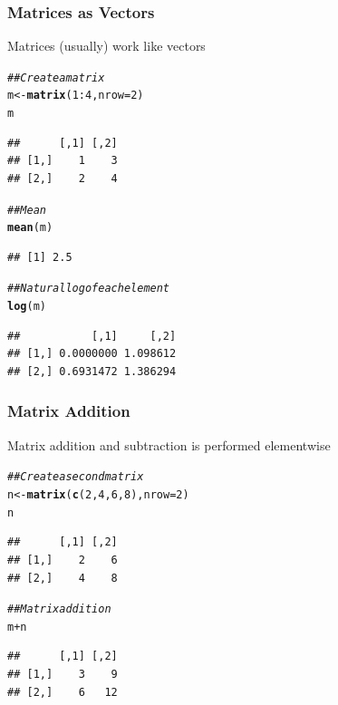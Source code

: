 \documentclass{beamer}\usepackage[]{graphicx}\usepackage[]{color}
\makeatletter
\newcommand{\hlnum}[1]{\textcolor[rgb]{0.686,0.059,0.569}{#1}}%
\newcommand{\hlcom}[1]{\textcolor[rgb]{0.678,0.584,0.686}{\textit{#1}}}%
\newcommand{\hlopt}[1]{\textcolor[rgb]{0,0,0}{#1}}%
\newcommand{\hlstd}[1]{\textcolor[rgb]{0.345,0.345,0.345}{#1}}%
\newcommand{\hlkwb}[1]{\textcolor[rgb]{0.69,0.353,0.396}{#1}}%
\newcommand{\hlkwc}[1]{\textcolor[rgb]{0.333,0.667,0.333}{#1}}%
\newcommand{\hlkwd}[1]{\textcolor[rgb]{0.737,0.353,0.396}{\textbf{#1}}}%
\newenvironment{kframe}{%
 \def\at@end@of@kframe{}%
 \ifinner\ifhmode%
  \def\at@end@of@kframe{\end{minipage}}%
  \begin{minipage}{\columnwidth}%
 \fi\fi%
 \def\FrameCommand##1{\hskip\@totalleftmargin \hskip-\fboxsep
 \colorbox{shadecolor}{##1}\hskip-\fboxsep
     \hskip-\linewidth \hskip-\@totalleftmargin \hskip\columnwidth}%
 \MakeFramed {\advance\hsize-\width
   \@totalleftmargin\z@ \linewidth\hsize
   \@setminipage}}%
 {\par\unskip\endMakeFramed%
 \at@end@of@kframe}
\newenvironment{knitrout}{}{} %
\makeatother
\begin{document}
\begin{frame}[fragile]\frametitle{Matrices as Vectors}
    Matrices (usually) work like vectors
\begin{knitrout}\footnotesize
{}\color{fgcolor}\begin{kframe}
\begin{alltt}
\hlcom{## Create a matrix}
\hlstd{m} \hlkwb{<-} \hlkwd{matrix}\hlstd{(}\hlnum{1}\hlopt{:}\hlnum{4}\hlstd{,} \hlkwc{nrow} \hlstd{=} \hlnum{2}\hlstd{)}
\hlstd{m}
\end{alltt}
\begin{verbatim}
##      [,1] [,2]
## [1,]    1    3
## [2,]    2    4
\end{verbatim}
\begin{alltt}
\hlcom{## Mean}
\hlkwd{mean}\hlstd{(m)}
\end{alltt}
\begin{verbatim}
## [1] 2.5
\end{verbatim}
\begin{alltt}
\hlcom{## Natural log of each element}
\hlkwd{log}\hlstd{(m)}
\end{alltt}
\begin{verbatim}
##           [,1]     [,2]
## [1,] 0.0000000 1.098612
## [2,] 0.6931472 1.386294
\end{verbatim}
\end{kframe}
\end{knitrout}
\end{frame}

\begin{frame}[fragile]\frametitle{Matrix Addition}
    Matrix addition and subtraction is performed elementwise
\begin{knitrout}\footnotesize
{}\color{fgcolor}\begin{kframe}
\begin{alltt}
\hlcom{## Create a second matrix}
\hlstd{n} \hlkwb{<-} \hlkwd{matrix}\hlstd{(}\hlkwd{c}\hlstd{(}\hlnum{2}\hlstd{,} \hlnum{4}\hlstd{,} \hlnum{6}\hlstd{,} \hlnum{8}\hlstd{),} \hlkwc{nrow} \hlstd{=} \hlnum{2}\hlstd{)}
\hlstd{n}
\end{alltt}
\begin{verbatim}
##      [,1] [,2]
## [1,]    2    6
## [2,]    4    8
\end{verbatim}
\begin{alltt}
\hlcom{## Matrix addition}
\hlstd{m} \hlopt{+} \hlstd{n}
\end{alltt}
\begin{verbatim}
##      [,1] [,2]
## [1,]    3    9
## [2,]    6   12
\end{verbatim}
\end{kframe}
\end{knitrout}
\end{frame}
\end{document}
